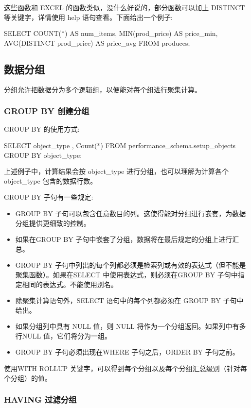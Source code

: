 这些函数和 EXCEL 的函数类似，没什么好说的，部分函数可以加上 DISTINCT 等关键字，详情使用 help 语句查看。下面给出一个例子:

\begin{sql}
SELECT COUNT(*) AS num_items,
    MIN(prod_price) AS price_min,
    AVG(DISTINCT prod_price) AS price_avg
FROM produces;
\end{sql}

\subsection{数据分组}

分组允许把数据分为多个逻辑组，以便能对每个组进行聚集计算。

\subsubsection{GROUP BY 创建分组}

GROUP BY 的使用方式:
\begin{sql}
SELECT object_type , Count(*) 
    FROM performance_schema.setup_objects 
    GROUP BY object_type; 
\end{sql}

上述例子中，计算结果会按 object\_type 进行分组，也可以理解为计算各个 object\_type 包含的数据行数。

GROUP BY 子句有一些规定:
\begin{itemize}
    \item GROUP BY 子句可以包含任意数目的列。这使得能对分组进行嵌套，为数据分组提供更细致的控制。
    \item 如果在GROUP BY 子句中嵌套了分组，数据将在最后规定的分组上进行汇总。
    \item GROUP BY 子句中列出的每个列都必须是检索列或有效的表达式（但不能是聚集函数）。如果在SELECT 中使用表达式，则必须在GROUP BY 子句中指定相同的表达式。不能使用别名。
    \item 除聚集计算语句外，SELECT 语句中的每个列都必须在 GROUP BY 子句中给出。
    \item 如果分组列中具有 NULL 值，则 NULL 将作为一个分组返回。如果列中有多行NULL 值，它们将分为一组。
    \item GROUP BY 子句必须出现在WHERE 子句之后，ORDER BY 子句之前。
\end{itemize}

使用WITH ROLLUP 关键字，可以得到每个分组以及每个分组汇总级别（针对每个分组）的值。

\subsubsection{HAVING 过滤分组}

